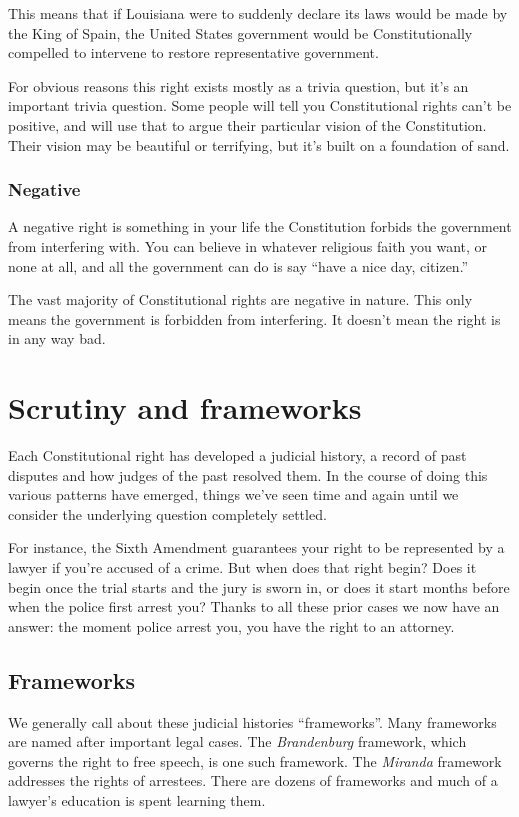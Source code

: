 \documentclass[10pt]{article}
\begin{document}
This means that if Louisiana were to suddenly declare its laws would be made by the King of Spain, the United States government would be Constitutionally compelled to intervene to restore representative government.

For obvious reasons this right exists mostly as a trivia question, but it's an important trivia question.  Some people will tell you Constitutional rights can't be positive, and will use that to argue their particular vision of the Constitution.  Their vision may be beautiful or terrifying, but it's built on a foundation of sand.

\subsubsection{Negative}
A negative right is something in your life the Constitution forbids the government from interfering with.  You can believe in whatever religious faith you want, or none at all, and all the government can do is say ``have a nice day, citizen.''

The vast majority of Constitutional rights are negative in nature.  This only means the government is forbidden from interfering.  It doesn't mean the right is in any way bad.

\section{Scrutiny and frameworks}
Each Constitutional right has developed a judicial history, a record of past disputes and how judges of the past resolved them.  In the course of doing this various patterns have emerged, things we've seen time and again until we consider the underlying question completely settled.

For instance, the Sixth Amendment guarantees your right to be represented by a lawyer if you're accused of a crime.  But when does that right begin?  Does it begin once the trial starts and the jury is sworn in, or does it start months before when the police first arrest you?  Thanks to all these prior cases we now have an answer: the moment police arrest you, you have the right to an attorney.

\subsection{Frameworks}
We generally call about these judicial histories ``frameworks''.  Many frameworks are named after important legal cases.  The {\it Brandenburg} framework, which governs the right to free speech, is one such framework.  The {\it Miranda} framework addresses the rights of arrestees.  There are dozens of frameworks and much of a lawyer's education is spent learning them.
\end{document}
